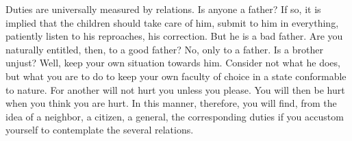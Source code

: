 Duties are universally measured by relations. Is  anyone a father? If so, it is
implied that the children should take care of him, submit to him in everything,
patiently listen to his reproaches, his correction. But he is a bad father. Are
you naturally  entitled, then, to  a good  father? No, only  to a father.  Is a
brother unjust? Well, keep your own situation towards him. Consider not what he
does, but  what you are  to do to  keep your own faculty  of choice in  a state
conformable to  nature. For another  will not hurt  you unless you  please. You
will then be hurt  when you think you are hurt. In  this manner, therefore, you
will find, from the idea of a neighbor, a citizen, a general, the corresponding
duties if you accustom yourself to contemplate the several relations.
